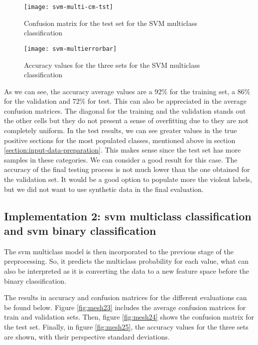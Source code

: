 	\begin{figure}[H]
		\centering
		\captionsetup{justification=centering}
		\texttt{[image: svm-multi-cm-tst]}
		\caption{Confusion matrix for the test set for the SVM multiclass classification}
		\label{fig:mesh19}
	\end{figure}

	\begin{figure}[H]
		\centering
		\captionsetup{justification=centering}
		\texttt{[image: svm-multierrorbar]}
		\caption{Accuracy values for the three sets for the SVM multiclass classification}
		\label{fig:mesh20}
	\end{figure}

	As we can see, the accuracy average values are a $92\%$ for the training set, a $86\%$ for the validation and $72\%$ for test. This can also be appreciated in the average confusion matrices. The diagonal for the training and the validation stands out the other cells but they do not present a sense of overfitting due to they are not completely uniform. In the test results, we can see greater values in the true positive sections for the most populated classes, mentioned above in section \ref{section:input-data-preparation}. This makes sense since the test set has more samples in these categories. We can consider a good result for this case. The accuracy of the final testing process is not much lower than the one obtained for the validation set. It would be a good option to populate more the violent labels, but we did not want to use synthetic data in the final evaluation.

\subsection{Implementation 2: \acrshort{svm} multiclass classification and \acrshort{svm} binary classification}

	The \acrshort{svm} multiclass model is then incorporated to the previous stage of the preprocessing. So, it predicts the multiclass probability for each value, what can also be interpreted as it is converting the data to a new feature space before the binary classification.
	
	The results in accuracy and confusion matrices for the different evaluations can be found below. Figure \ref{fig:mesh23} includes the average confusion matrices for train and validation sets. Then, figure \ref{fig:mesh24} shows the confusion matrix for the test set. Finally, in figure \ref{fig:mesh25}, the accuracy values for the three sets are shown, with their perspective standard deviations.
	
